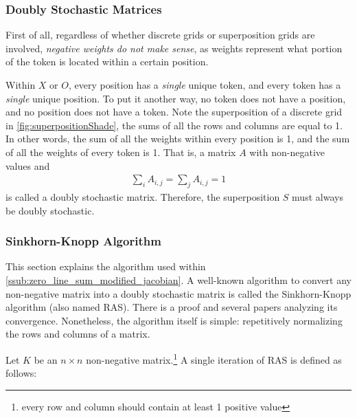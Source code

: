 \subsubsection{Doubly Stochastic Matrices}%
\label{ssub:doubly_stochastic_matrices}
First of all, regardless of whether discrete grids or superposition grids are involved, \emph{negative weights do not make sense}, as weights represent what portion of the token is located within a certain position.

Within $X$ or $O$, every position has a \emph{single} unique token, and every token has a \emph{single} unique position. To put it another way, no token does not have a position, and no position does not have a token. Note the superposition of a discrete grid in \ref{fig:superpositionShade}, the sums of all the rows and columns are equal to 1. In other words, the sum of all the weights within every position is 1, and the sum of all the weights of every token is 1. That is, a matrix $A$ with non-negative values and
\begin{align*}
    \sum_i A_{i,j}=\sum_j A_{i,j}=1
\end{align*}
is called a doubly stochastic matrix.\cite{weissteinDoubly} Therefore, the superposition $S$ must always be doubly stochastic.

\subsubsection{Sinkhorn-Knopp Algorithm}%
\label{ssub:sinkhorn_knopp_algorithm}
This section explains the algorithm used within \ref{ssub:zero_line_sum_modified_jacobian}.
A well-known algorithm to convert any non-negative matrix into a doubly stochastic matrix is called the Sinkhorn-Knopp algorithm (also named RAS).\cite{sinkhorn1967concerning} There is a proof\cite{borobia1998matrix} and several papers\cite{chakrabarty2018better,knight2008sinkhorn} analyzing its convergence. Nonetheless, the algorithm itself is simple: repetitively normalizing the rows and columns of a matrix.

Let $K$ be an $n\times n$ non-negative matrix.\footnote{every row and column should contain at least 1 positive value} A single iteration of RAS is defined as follows:

